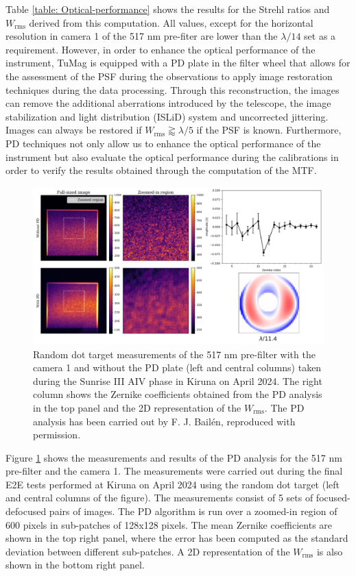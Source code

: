 Table \ref{table: Optical-performance} shows the results for the Strehl ratios and $W_{\text{rms}}$ derived from this computation. All values, except for the horizontal resolution in camera 1 of the 517 nm pre-fiter are lower than the $\lambda/14$ set as a requirement. However, in order to enhance the optical performance of the instrument, TuMag is equipped with a PD plate in the filter wheel that allows for the assessment of the PSF during the observations to apply image restoration techniques during the data processing. Through this reconstruction, the images can remove the additional aberrations introduced by the telescope, the image stabilization and light distribution (ISLiD) system and uncorrected jittering. Images can always be restored if $W_{\text{rms}} \gtrapprox \lambda / 5$ \citep{vargas_tesis} if the PSF is known. Furthermore, PD techniques not only allow us to enhance the optical performance of the instrument but also evaluate the optical performance during the calibrations in order to verify the results obtained through the computation of the MTF. 

\begin{figure}[t]
    \includegraphics[width=\textwidth]{figures/TuMag/PD_e2e.pdf}
    \caption[E2E PD analysis of TuMag's optical performance.]{Random dot target measurements of the 517 nm pre-filter with the camera 1 and without the PD plate (left and central columns) taken during the Sunrise III AIV phase in Kiruna on April 2024. The right column shows the Zernike coefficients obtained from the PD analysis in the top panel and the 2D representation of the $W_{\text{rms}}$. The PD analysis has been carried out by F. J. Bailén, reproduced with permission.}
      \label{tumag : PD}
\end{figure}

Figure \ref{tumag : PD} shows the measurements and results of the PD analysis for the 517 nm pre-filter and the camera 1. The measurements were carried out during the final E2E tests performed at Kiruna on April 2024 using the random dot target (left and central columns of the figure). The measurements consist of 5 sets of focused-defocused pairs of images. The PD algorithm is run over a zoomed-in region of 600 pixels in sub-patches of 128x128 pixels. The mean Zernike coefficients are shown in the top right panel, where the error has been computed as the standard deviation between different sub-patches. A 2D representation of the $W_{\text{rms}}$ is also shown in the bottom right panel. 

